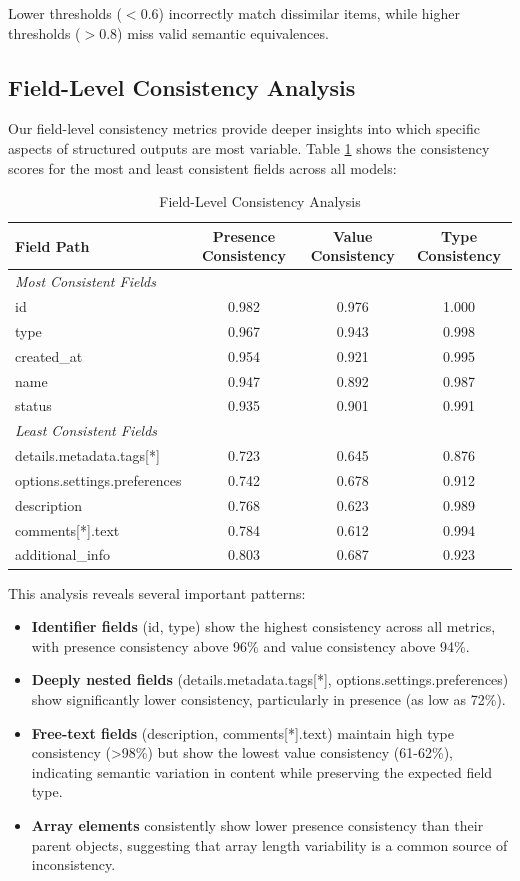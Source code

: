 \documentclass[letterpaper]{article} %
\begin{document}
Lower thresholds ($<0.6$) incorrectly match dissimilar items, while higher thresholds ($>0.8$) miss valid semantic equivalences.

\subsection{Field-Level Consistency Analysis}

Our field-level consistency metrics provide deeper insights into which specific aspects of structured outputs are most variable. Table \ref{tab:field_consistency} shows the consistency scores for the most and least consistent fields across all models:

\begin{table}[h]
\centering
\caption{Field-Level Consistency Analysis}
\label{tab:field_consistency}
\begin{tabular}{lccc}
\toprule
Field Path & Presence Consistency & Value Consistency & Type Consistency \\
\midrule
\multicolumn{4}{l}{\textit{Most Consistent Fields}} \\
id & 0.982 & 0.976 & 1.000 \\
type & 0.967 & 0.943 & 0.998 \\
created\_at & 0.954 & 0.921 & 0.995 \\
name & 0.947 & 0.892 & 0.987 \\
status & 0.935 & 0.901 & 0.991 \\
\midrule
\multicolumn{4}{l}{\textit{Least Consistent Fields}} \\
details.metadata.tags[*] & 0.723 & 0.645 & 0.876 \\
options.settings.preferences & 0.742 & 0.678 & 0.912 \\
description & 0.768 & 0.623 & 0.989 \\
comments[*].text & 0.784 & 0.612 & 0.994 \\
additional\_info & 0.803 & 0.687 & 0.923 \\
\bottomrule
\end{tabular}
\end{table}

This analysis reveals several important patterns:

\begin{itemize}
\item \textbf{Identifier fields} (id, type) show the highest consistency across all metrics, with presence consistency above 96\% and value consistency above 94\%.
\item \textbf{Deeply nested fields} (details.metadata.tags[*], options.settings.preferences) show significantly lower consistency, particularly in presence (as low as 72\%).
\item \textbf{Free-text fields} (description, comments[*].text) maintain high type consistency (>98\%) but show the lowest value consistency (61-62\%), indicating semantic variation in content while preserving the expected field type.
\item \textbf{Array elements} consistently show lower presence consistency than their parent objects, suggesting that array length variability is a common source of inconsistency.
\end{itemize}
\end{document}
